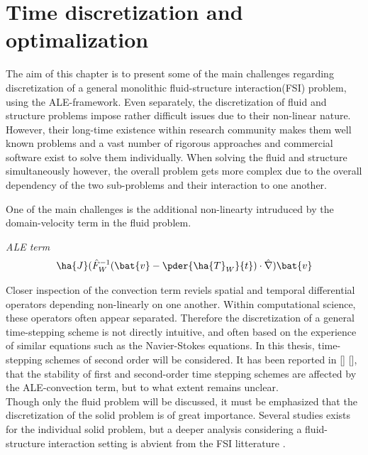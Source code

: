 \chapter{Time discretization and optimalization}

The aim of this chapter is to present some of the main challenges regarding discretization of a general monolithic fluid-structure interaction(FSI) problem, using the ALE-framework. Even separately, the discretization of fluid and structure problems impose rather difficult issues due to their non-linear nature. However, their long-time existence within research community makes them well known problems and a vast number of rigorous approaches and commercial  software exist to solve them individually. When solving the fluid and structure simultaneously however, the overall problem gets more complex due to the overall dependency of the two sub-problems and their interaction to one another. 

One of the main challenges is the additional non-linearty intruduced by the domain-velocity term in the fluid problem. 
\begin{prob}
\textit{ALE term}\begin{align*}
\ha{J} (\hat{F}_W^{-1}(\bat{v} - \pder{\ha{T}_W}{t}) \cdot \hat{\nabla}) \bat{v}
\end{align*} 
\end{prob}
Closer inspection of the convection term reviels spatial and temporal differential operators depending non-linearly on one another. Within computational science, these operators often appear separated. Therefore the discretization of a general time-stepping scheme  is not directly intuitive, and often based on the experience of similar equations such as the Navier-Stokes equations. In this thesis, time-stepping schemes of second order will be considered.
It has been reported in [] [], that the stability of first and second-order time stepping schemes are affected by the ALE-convection term, but to what extent remains unclear.\\
Though only the fluid problem will be discussed, it must be emphasized that the discretization of the solid problem is of great importance. Several studies exists for the individual solid problem, but a deeper analysis considering a fluid-structure interaction setting is abvient from the FSI litterature \cite{Richter2015}.                                                                                                                                                                                                                       




